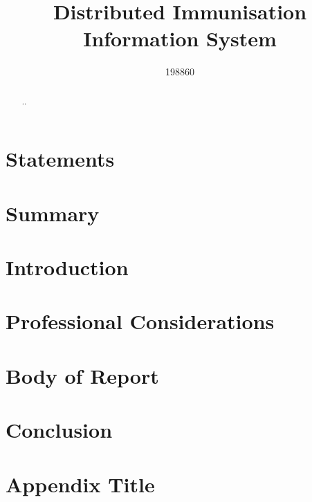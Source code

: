 \documentclass{report}
\title{Distributed Immunisation Information System}
\author{198860}
\begin{document}


\begin{abstract}
..
\end{abstract}

\begin{flushleft}

\chapter{Statements}


\chapter{Summary}


\tableofcontents

\listoffigures

\chapter{Introduction}


\chapter{Professional Considerations}


\chapter{Body of Report}


\chapter{Conclusion}


\printbibliography

\appendix
\chapter{Appendix Title}



\end{flushleft}
\end{document}
